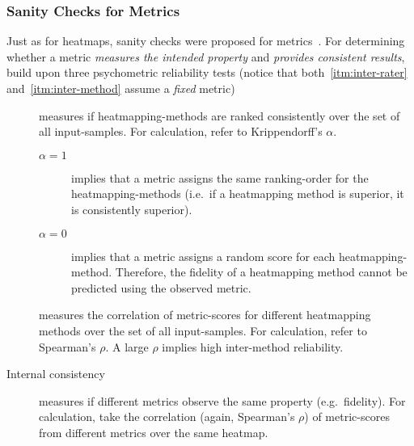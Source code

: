 
\subsubsection{Sanity Checks for Metrics}\label{metrics:sanity-checks}
Just as for heatmaps, sanity checks were proposed for metrics~\cite{Tomsett.2019}. For determining whether a metric \textit{measures the intended property} and \textit{provides consistent results}, \citeauthor{Tomsett.2019} build upon three psychometric reliability tests (notice that both~\ref{itm:inter-rater} and~\ref{itm:inter-method} assume a \textit{fixed} metric)
\begin{description}
    \item[] measures if heatmapping-methods are ranked consistently over the set of all input-samples.
    For calculation, \citeauthor{Tomsett.2019} refer to Krippendorff's \(\alpha\).
    \begin{description}
        \item[\(\alpha = 1\)] implies that a metric assigns the same ranking-order for the heatmapping-methods (i.e.\ if a heatmapping method is superior, it is consistently superior). 
        \item[\(\alpha = 0\)] implies that a metric assigns a random score for each heatmapping-method. Therefore, the fidelity of a heatmapping method cannot be predicted using the observed metric.
    \end{description} 
    \item[] measures the correlation of metric-scores for different heatmapping methods over the set of all input-samples. For calculation, \citeauthor{Tomsett.2019} refer to Spearman's \(\rho\). A large \(\rho\) implies high inter-method reliability.
    \item[Internal consistency] measures if different metrics observe the same property (e.g.\ fidelity). For calculation, \citeauthor{Tomsett.2019} take the correlation (again, Spearman's \(\rho\)) of metric-scores from different metrics over the same heatmap.
\end{description}

